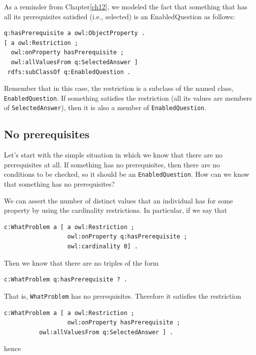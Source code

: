 As a reminder from Chapter\ref{ch12}, we modeled the fact that something that
has all its prerequisites satisfied (i.e., selected) is an
EnabledQuestion as follows:

\begin{lstlisting}
q:hasPrerequisite a owl:ObjectProperty .
[ a owl:Restriction ;
  owl:onProperty hasPrerequisite ;
  owl:allValuesFrom q:SelectedAnswer ] 
 rdfs:subClassOf q:EnabledQuestion .
\end{lstlisting}

Remember that in this case, the restriction is a subclass of the named class, \texttt{EnabledQuestion}.
If something satisfies the restriction (all its values are members of
\texttt{SelectedAnswer}), then it is also a member of \texttt{EnabledQuestion}.

\subsection{No prerequisites}

Let's start with the simple situation in which we know that there are no
prerequisites at all. If something has no prerequisites, then there are
no conditions to be checked, so it should be an \texttt{EnabledQuestion}. How can
we know that something has no prerequisites?

We can assert the number of distinct values that an individual has for
some property by using the
cardinality restrictions. In particular, if we say that

\begin{lstlisting}
c:WhatProblem a [ a owl:Restriction ;
                  owl:onProperty q:hasPrerequisite ;
                  owl:cardinality 0] .
\end{lstlisting}

Then we know that there are no triples of the form

\begin{lstlisting}
c:WhatProblem q:hasPrerequisite ? .
\end{lstlisting}

That is, \texttt{WhatProblem} has no prerequisites. Therefore it satisfies the
restriction

\begin{lstlisting}
c:WhatProblem a [ a owl:Restriction ;
                  owl:onProperty hasPrerequisite ;
		  owl:allValuesFrom q:SelectedAnswer ] .
\end{lstlisting}

hence

